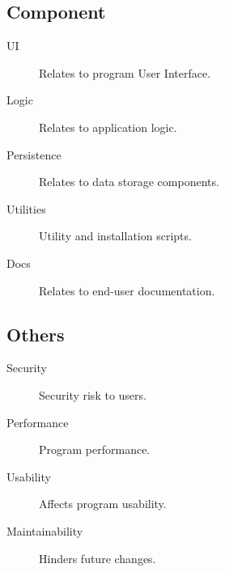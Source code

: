 \subsection{Component}
\begin{description}
\item[UI]
Relates to program User Interface.
\item[Logic]
Relates to application logic.
\item[Persistence]
Relates to data storage components.
\item[Utilities]
Utility and installation scripts.
\item[Docs]
Relates to end-user documentation.
\end{description}
\subsection{Others}
\begin{description}
\item[Security]
Security risk to users.
\item[Performance]
Program performance.
\item[Usability]
Affects program usability.
\item[Maintainability]
Hinders future changes.
\end{description}

